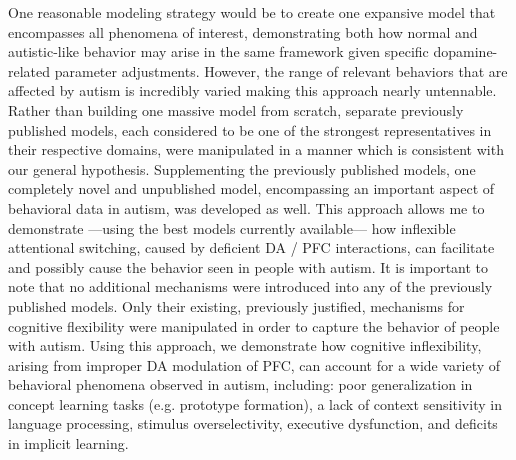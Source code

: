 %
% 

One reasonable modeling strategy would be to create one expansive model that encompasses all phenomena of interest, demonstrating both how normal and autistic-like behavior may arise in the same framework given specific dopamine-related parameter adjustments.  However, the range of relevant behaviors that are affected by autism is incredibly varied making this approach nearly untennable.   Rather than building one massive model from scratch, separate previously published models, each considered to be one of the strongest representatives in their respective domains, were manipulated in a manner which is consistent with our general hypothesis.  Supplementing the previously published models, one completely novel and unpublished model, encompassing an important aspect of behavioral data in autism, was developed as well.  This approach allows me to demonstrate ---using the best models currently available--- how inflexible attentional switching, caused by deficient DA / PFC interactions, can facilitate and possibly cause the behavior seen in people with autism.  It is important to note that no additional mechanisms were introduced into any of the previously published models.  Only their existing, previously justified, mechanisms for cognitive flexibility were manipulated in order to capture the behavior of people with autism.  Using this approach, we demonstrate how cognitive inflexibility, arising from improper DA modulation of PFC, can account for a wide variety of behavioral phenomena observed in autism, including: poor generalization in concept learning tasks (e.g. prototype formation), a lack of context sensitivity in language processing, stimulus overselectivity, executive dysfunction, and deficits in implicit learning. 


